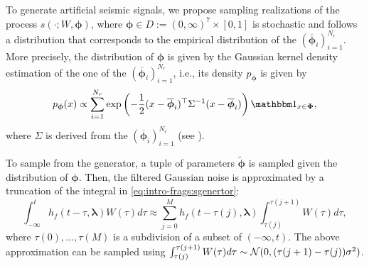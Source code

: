 To generate artificial seismic signals, we propose sampling realizations of the process $s(\cdot;W,\boldsymbol{\phi})$, where $\boldsymbol{\phi}\in D:=(0,\infty)^7\times[0,1]$ is stochastic and follows a distribution that corresponds to the empirical distribution of the $(\overline{\boldsymbol{\phi}}_i)_{i=1}^{N_r}$. More precisely, the distribution of $\boldsymbol{\phi}$ is  given by the Gaussian kernel density estimation %
of the one of the $(\overline{\boldsymbol\phi}_i)_{i=1}^{N_r}$, i.e., its density $p_{\boldsymbol{\phi}}$ is given by
\begin{equation}
    p_{\boldsymbol{\phi}}(x) \propto \sum_{i=1}^{N_r}\exp\left( -\frac{1}{2} (x-\overline{\boldsymbol\phi}_i)^\top\Sigma^{-1}(x-\overline{\boldsymbol\phi}_i) \right)\indic_{x\in\boldsymbol{\Phi}},
\end{equation}
where $\Sigma$ is derived from the $(\overline{\boldsymbol{\phi}}_i)_{i=1}^{N_r}$ (see \cite{kristan_multivariate_2011}).

To sample from the generator, a tuple of parameters $\tilde{\boldsymbol{\phi}}$ is sampled given the distribution of $\boldsymbol{\phi}$. Then, the filtered Gaussian noise is approximated by a truncation of the integral in \cref{eq:intro-frags:sgenertor}:
    \begin{equation}
        \int_{-\infty}^t h_f(t-\tau,\boldsymbol\lambda)W(\tau)d\tau \approx \sum_{j=0}^{M}h_f(t- \tau(j),\boldsymbol{\lambda} ) \int_{\tau(j)}^{\tau(j+1)}W(\tau)d\tau, %
    \end{equation}
where $\tau(0),\dots,\tau(M)$ is a subdivision of a subset of $(-\infty,t)$.
The above approximation can be sampled using $\int_{\tau(j)}^{\tau(j+1)}W(\tau)d\tau\sim\mathcal{N}(0,(\tau(j+1)-\tau(j))\sigma^2)$.







